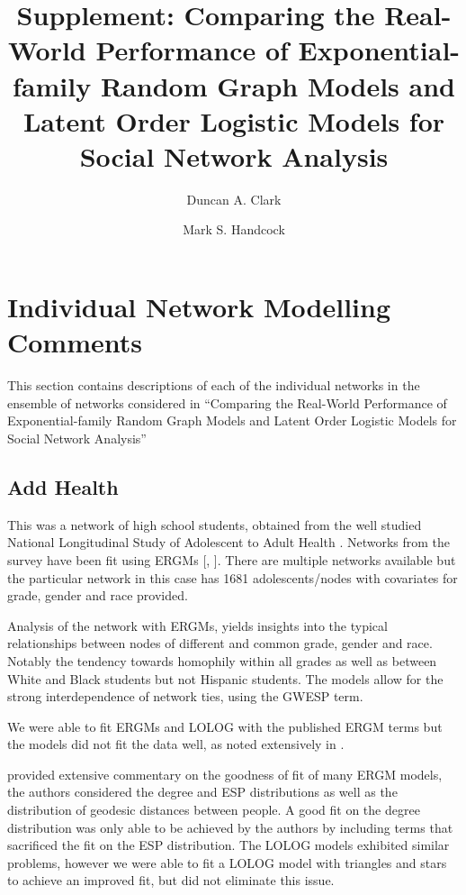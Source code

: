 \documentclass[
]{statsoc}
\title[Supplement: Comparing the Real-World Performance of ERGMs and LOLOG Models for Social Network Analysis]{Supplement: Comparing the Real-World Performance of Exponential-family Random Graph Models and Latent Order Logistic Models for Social Network Analysis}
\author[Duncan A. Clark]{Duncan A. Clark}
\author[Mark S. Handcock]{Mark S. Handcock}
\author{}
\date{\vspace{-2.5em}}
\begin{document}
\newcommand{\R}{\mathbb{R}}
\newcommand{\N}{\mathbb{N}}
\newcommand{\E}{\mathbb{E}}
\newcommand{\V}{\mathbb{V}}
\newcommand{\bfR}{\mathbf{R}}
\newcommand{\bfX}{\mathbf{X}}
\newcommand{\bfW}{\mathbf{W}}
\newcommand{\bfD}{\mathbf{D}}
\newcommand{\INT}{\int_{-\infty}^{+\infty}}
\newcommand{\p}{\partial}
\newcommand{\ra}{\Rightarrow}
\newcommand{\dH}{d\mathscr{H}}
\newcommand{\ch}{\text{cosh}}
\newcommand{\sh}{\text{sinh}}
\newcommand{\ex}{\mathbb{E}\left[X\right]}
\newcommand{\ey}{\mathbb{E}\left[Y\right]}
\newcommand{\logit}{{\rm logit}}
\newcommand{\MOM}{{\rm MOM}}

\setcounter{secnumdepth}{4}

\section{Individual Network Modelling Comments}\label{app:comments}

This section contains descriptions of each of the individual networks in
the ensemble of networks considered in ``Comparing the Real-World
Performance of Exponential-family Random Graph Models and Latent Order
Logistic Models for Social Network Analysis''

\subsection{Add Health}

This was a network of high school students, obtained from the well
studied National Longitudinal Study of Adolescent to Adult Health
\citep{AddHealth2007}. Networks from the survey have been fit using
ERGMs {[}\cite{Goodreau2007}, \cite{Hunter_Goodreau_2008}{]}. There are
multiple networks available but the particular network in this case has
1681 adolescents/nodes with covariates for grade, gender and race
provided.

Analysis of the network with ERGMs, yields insights into the typical
relationships between nodes of different and common grade, gender and
race. Notably the tendency towards homophily within all grades as well
as between White and Black students but not Hispanic students. The
models allow for the strong interdependence of network ties, using the
GWESP term.

We were able to fit ERGMs and LOLOG with the published ERGM terms but
the models did not fit the data well, as noted extensively in
\cite{Goodreau2007}.

\cite{Goodreau2007} provided extensive commentary on the goodness of fit
of many ERGM models, the authors considered the degree and ESP
distributions as well as the distribution of geodesic distances between
people. A good fit on the degree distribution was only able to be
achieved by the authors by including terms that sacrificed the fit on
the ESP distribution. The LOLOG models exhibited similar problems,
however we were able to fit a LOLOG model with triangles and stars to
achieve an improved fit, but did not eliminate this issue.
\end{document}
